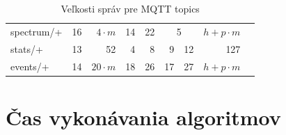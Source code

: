 \begin{table}[h]
\begin{tabular}{|l|r|r|rr|cr|r|l}
spectrum/+                           & 16                                                                                                        & $4\cdot m$                                                                                                & \multicolumn{1}{r|}{14}            & 22                                 & \multicolumn{2}{c|}{5}                                                  & $h + p\cdot m$                                                                                                 &           \\ \cline{1-8}
stats/+                              & 13                                                                                                        & 52                                                                                                     & \multicolumn{1}{r|}{4}             & 8                                  & \multicolumn{1}{r|}{9}             & 12                                 & 127                                                                                                           &           \\ \cline{1-8}
events/+                             & 14                                                                                                        & $20\cdot m$                                                                                               & \multicolumn{1}{r|}{18}            & 26                                 & \multicolumn{1}{r|}{17}            & 27                                 & $h + p\cdot m$                                                                                                &           \\ \cline{1-8}
\end{tabular}
\caption{Veľkosti správ pre MQTT topics}
\end{table}



\section{Čas vykonávania algoritmov}

